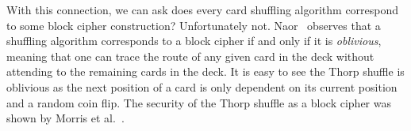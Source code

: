 With this connection, we can ask does every card shuffling algorithm correspond to some block cipher construction?
Unfortunately not.
Naor~\cite{NaorReingold99} observes that a shuffling algorithm corresponds to a block cipher if and only if it is \emph{oblivious}, meaning that one can trace the route of any given card in the deck without attending to the remaining cards in the deck.
It is easy to see the Thorp shuffle is oblivious as the next position of a card is only dependent on its current position and a random coin flip.
The security of the Thorp shuffle as a block cipher was shown by Morris et al.~\cite{MRS09}.



\newcommand{\thorpcarddist}{0.3cm}
\newcommand{\thorpcarddisthalf}{0.15cm}
\newcommand{\thorpcarddisthalfplus}{0.502cm}
\newcommand{\thorplabeldist}{0.05cm}
\newcommand{\thorpcarddivtop}{0.75cm}
\newcommand{\thorpcarddivbot}{0.45cm}
\newcommand{\thorpshuffledist}{1.4cm}
\newcommand{\thorpshuffledisthalf}{0.7cm}
\newcommand{\thorpcarddistshort}{0.15cm}

